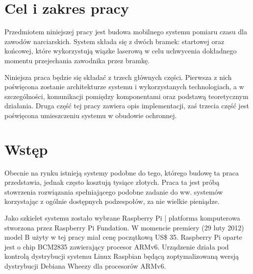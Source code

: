 \documentclass[11pt,a4paper, twoside]{article}
\begin{document}
 

\tableofcontents

\newpage
\cleardoublepage
\section{Cel i zakres pracy}
Przedmiotem niniejszej pracy jest budowa mobilnego systemu pomiaru czasu dla zawodów narciarskich. System składa się z dwóch bramek: startowej oraz końcowej, które wykorzystują wiązke laserową w celu uchwycenia dokładnego momentu przejechania zawodnika przez bramkę. 

Niniejsza praca będzie się składać z trzech głównych części. Pierwsza z nich poświęcona zostanie architekturze systemu i wykorzystanych technologiach, a w szczególności, komunikacji pomiędzy komponentami oraz podstawą teoretycznym działania. Druga część tej pracy zawiera opis implementacji, zaś trzecia część jest poświęcona umieszczeniu systemu w obudowie ochronnej.

\section{Wstęp}
Obecnie na rynku istnieją systemy podobne do tego, którego budowę ta praca przedstawia, jednak często kosztują tysiące złotych. Praca ta jest próbą stowrzenia rozwiązania spełniającego podobne zadanie do ww. systemów korzystając z ogólnie dostępnych podzespołów, za nie wielkie pieniądze.

Jako szkielet systemu zostało wybrane Raspberry Pi | platforma komputerowa stworzona przez Raspberry Pi Fundation. W momencie premiery (29 luty 2012) model B użyty w tej pracy miał cenę początkową US\$ 35. Raspberry Pi oparte jest o chip BCM2835 zawierający procesor ARMv6. Urządzenie działa pod kontrolą dystrybucji systemu Linux Raspbian będącą zoptymalizowaną wersją dystrybucji Debiana Wheezy dla procesorów ARMv6.
\end{document}
